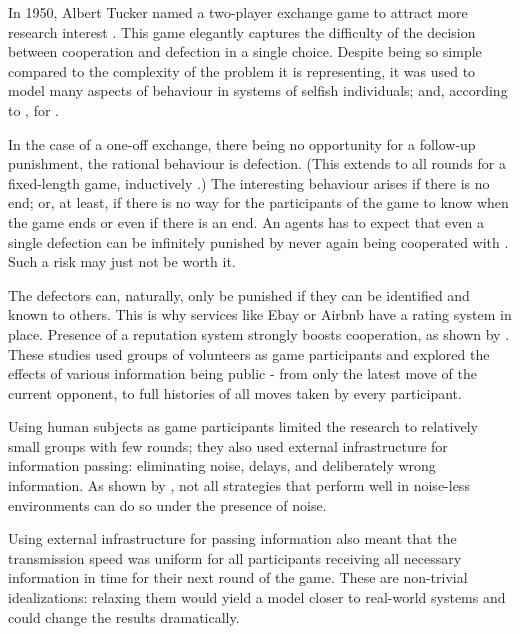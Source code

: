\documentclass[english]{article}
\begin{document}
In 1950, Albert Tucker named a two-player exchange game
 to attract more research interest \citep{sep-prisoner-dilemma}.
This game elegantly captures the difficulty of the decision between cooperation and defection in a single choice.
Despite being so simple compared to the complexity of the problem it is representing, it was used to model many aspects of behaviour in systems of selfish individuals; and, according to \citet{Axelrod84}, for .

In the case of a one-off exchange, there being no opportunity for a follow-up punishment, the rational behaviour is defection. (This extends to all rounds for a fixed-length game, inductively \citep{Axelrod84}.)
The interesting behaviour arises if there is no end; or, at least, if there is no way for the participants of the game to know when the game ends or even if there is an end.
An agents has to expect that even a single defection can be infinitely punished by never again being cooperated with \citep{GRIM}.
Such a risk may just not be worth it.

The defectors can, naturally, only be punished if they can be identified and known to others. This is why services like Ebay or Airbnb have a rating system in place.
Presence of a reputation system strongly boosts cooperation, as shown by \citet{simple-reputation, public-private-monitoring}.
These studies used groups of volunteers as game participants and explored the effects of various information being public - from only the latest move of the current opponent, to full histories of all moves taken by every participant.

Using human subjects as game participants limited the research to relatively small groups with few rounds; they also used external infrastructure for information passing: eliminating noise, delays, and deliberately wrong information.
As shown by \citet{noise}, not all strategies that perform well in noise-less environments can do so under the presence of noise.

Using external infrastructure for passing information also meant that the transmission speed was uniform for all participants receiving all necessary information in time for their next round of the game.
These are non-trivial idealizations: relaxing them would yield a model closer to real-world systems and could change the results dramatically.
\end{document}
